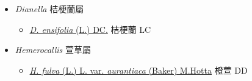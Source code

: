 
  \begin{itemize}
 \item[] \textit{Dianella} 桔梗蘭屬
                                
  \begin{itemize}
        \item[] \href{http://www.theplantlist.org/tpl1.1/search?q=Dianella+ensifolia}{\textit{D. ensifolia} (L.) DC.}   桔梗蘭   LC
  \end{itemize}
 \item[] \textit{Hemerocallis} 萱草屬
                                
  \begin{itemize}
        \item[] \href{http://www.theplantlist.org/tpl1.1/search?q=Hemerocallis+fulva+var.+aurantiaca}{\textit{H. fulva} (L.) L. var. \textit{aurantiaca} (Baker) M.Hotta}   橙萱   DD
  \end{itemize}
  \end{itemize}
